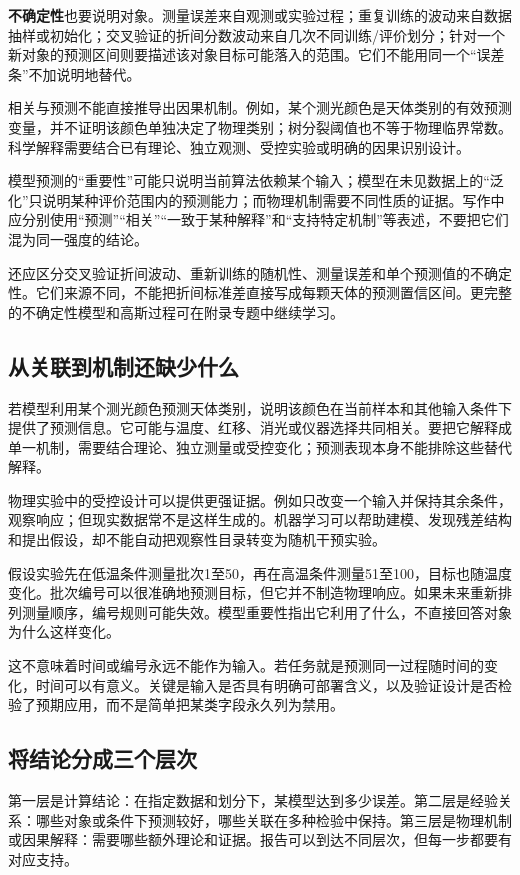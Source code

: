 \textbf{不确定性}也要说明对象。测量误差来自观测或实验过程；重复训练的波动来自数据抽样或初始化；交叉验证的折间分数波动来自几次不同训练/评价划分；针对一个新对象的预测区间则要描述该对象目标可能落入的范围。它们不能用同一个“误差条”不加说明地替代。

相关与预测不能直接推导出因果机制。例如，某个测光颜色是天体类别的有效预测变量，并不证明该颜色单独决定了物理类别；树分裂阈值也不等于物理临界常数。科学解释需要结合已有理论、独立观测、受控实验或明确的因果识别设计。

模型预测的“重要性”可能只说明当前算法依赖某个输入；模型在未见数据上的“泛化”只说明某种评价范围内的预测能力；而物理机制需要不同性质的证据。写作中应分别使用“预测”“相关”“一致于某种解释”和“支持特定机制”等表述，不要把它们混为同一强度的结论。

还应区分交叉验证折间波动、重新训练的随机性、测量误差和单个预测值的不确定性。它们来源不同，不能把折间标准差直接写成每颗天体的预测置信区间。更完整的不确定性模型和高斯过程可在附录专题中继续学习。

\subsection{从关联到机制还缺少什么}
若模型利用某个测光颜色预测天体类别，说明该颜色在当前样本和其他输入条件下提供了预测信息。它可能与温度、红移、消光或仪器选择共同相关。要把它解释成单一机制，需要结合理论、独立测量或受控变化；预测表现本身不能排除这些替代解释。

物理实验中的受控设计可以提供更强证据。例如只改变一个输入并保持其余条件，观察响应；但现实数据常不是这样生成的。机器学习可以帮助建模、发现残差结构和提出假设，却不能自动把观察性目录转变为随机干预实验。

假设实验先在低温条件测量批次1至50，再在高温条件测量51至100，目标也随温度变化。批次编号可以很准确地预测目标，但它并不制造物理响应。如果未来重新排列测量顺序，编号规则可能失效。模型重要性指出它利用了什么，不直接回答对象为什么这样变化。

这不意味着时间或编号永远不能作为输入。若任务就是预测同一过程随时间的变化，时间可以有意义。关键是输入是否具有明确可部署含义，以及验证设计是否检验了预期应用，而不是简单把某类字段永久列为禁用。

\subsection{将结论分成三个层次}
第一层是计算结论：在指定数据和划分下，某模型达到多少误差。第二层是经验关系：哪些对象或条件下预测较好，哪些关联在多种检验中保持。第三层是物理机制或因果解释：需要哪些额外理论和证据。报告可以到达不同层次，但每一步都要有对应支持。

